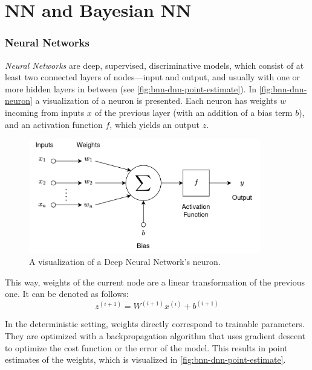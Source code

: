 \section{NN and Bayesian NN}\label{sec:bnn}
\subsubsection{Neural Networks}
\textit{Neural Networks} are deep, supervised, discriminative models, which consist of at least two connected layers of nodes—input and output, and usually with one or more hidden layers in between (see \autoref{fig:bnn-dnn-point-estimate}). In \autoref{fig:bnn-dnn-neuron} a visualization of a neuron is presented. Each neuron has weights $w$ incoming from inputs $x$ of the previous layer (with an addition of a bias term $b$), and an activation function $f$, which yields an output $z$.

\begin{figure}[h]
     \centering
     \includegraphics[width=0.9\textwidth]{methods/img/DNN_neuron.drawio.png}
     \caption[A DNN neuron]{A visualization of a Deep Neural Network's neuron.}
    \label{fig:bnn-dnn-neuron}
\end{figure}

\noindent This way, weights of the current node are a linear transformation of the previous one. It can be denoted as follows:
\begin{equation}
    z^{(i+1)} = W^{(i+1)}x^{(i)} + b^{(i+1)}
\end{equation}

\noindent In the deterministic setting, weights directly correspond to trainable parameters. They are optimized with a backpropagation algorithm that uses gradient descent to optimize the cost function or the error of the model. This results in point estimates of the weights, which is visualized in \autoref{fig:bnn-dnn-point-estimate}.

